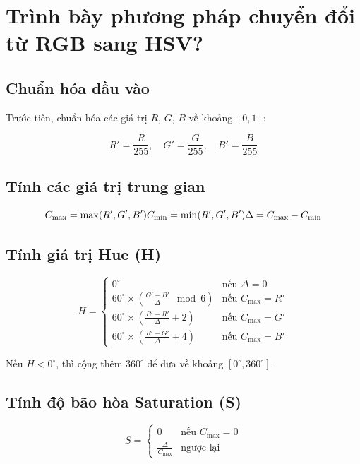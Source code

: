 \documentclass[12pt]{article}
\begin{document}
	\section{Trình bày phương pháp chuyển đổi từ RGB sang HSV?}
	
	\subsection{Chuẩn hóa đầu vào}
	
	Trước tiên, chuẩn hóa các giá trị $R$, $G$, $B$ về khoảng $[0, 1]$:
	
	\[
	R' = \frac{R}{255}, \quad G' = \frac{G}{255}, \quad B' = \frac{B}{255}
	\]
	
	\subsection{Tính các giá trị trung gian}
	
	\[
	C_{\text{max}} = \max(R', G', B') \\
	C_{\text{min}} = \min(R', G', B') \\
	\Delta = C_{\text{max}} - C_{\text{min}}
	\]
	
	\subsection{Tính giá trị Hue (H)}
	
	\[
	H =
	\begin{cases}
	0^\circ & \text{nếu } \Delta = 0 \\
	60^\circ \times \left( \frac{G' - B'}{\Delta} \mod 6 \right) & \text{nếu } C_{\text{max}} = R' \\
	60^\circ \times \left( \frac{B' - R'}{\Delta} + 2 \right) & \text{nếu } C_{\text{max}} = G' \\
	60^\circ \times \left( \frac{R' - G'}{\Delta} + 4 \right) & \text{nếu } C_{\text{max}} = B'
	\end{cases}
	\]
	
	Nếu $H < 0^\circ$, thì cộng thêm $360^\circ$ để đưa về khoảng $[0^\circ, 360^\circ]$.
	
	\subsection{Tính độ bão hòa Saturation (S)}
	
	\[
	S =
	\begin{cases}
	0 & \text{nếu } C_{\text{max}} = 0 \\
	\frac{\Delta}{C_{\text{max}}} & \text{ngược lại}
	\end{cases}
	\]
	
\end{document}
